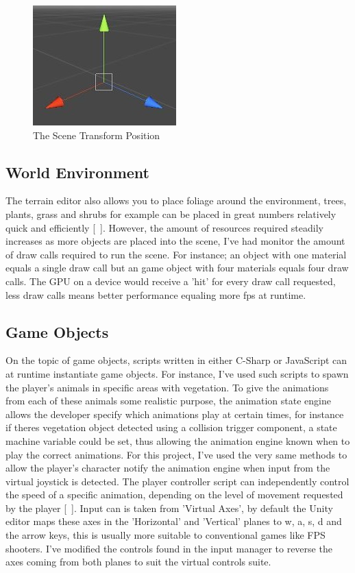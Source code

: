 \begin{figure}[!ht]
	\caption{The Scene Transform Position}
	\centering
	\includegraphics{img/transform.jpg}
\end{figure}

\subsection{World Environment}
The terrain editor also allows you to place foliage around the environment, trees, plants, grass and shrubs for example can be placed in great numbers relatively quick and efficiently [~\cite{Scenes}]. However, the amount of resources required steadily increases as more objects are placed into the scene, I've had monitor the amount of draw calls required to run the scene. For instance; an object with one material equals a single draw call but an game object with four materials equals four draw calls. The GPU on a device would receive a 'hit' for every draw call requested, less draw calls means better performance equaling more fps at runtime.
\subsection{Game Objects}
On the topic of game objects, scripts written in either C-Sharp or JavaScript can at runtime instantiate game objects. For instance, I've used such scripts to spawn the player's animals in specific areas with vegetation. To give the animations from each of these animals some realistic purpose, the animation state engine allows the developer specify which animations play at certain times, for instance if theres vegetation object detected using a collision trigger component, a state machine variable could be set, thus allowing the animation engine known when to play the correct animations. For this project, I've used the very same methods to allow the player's character notify the animation engine when input from the virtual joystick is detected. The player controller script can independently control the speed of a specific animation, depending on the level of movement requested by the player [~\cite{Game-Objects}]. Input can is taken from 'Virtual Axes', by default the Unity editor maps these axes in the 'Horizontal' and 'Vertical' planes to w, a, s, d and the arrow keys, this is usually more suitable to conventional games like FPS shooters. I've modified the controls found in the input manager to reverse the axes coming from both planes to suit the virtual controls suite.
